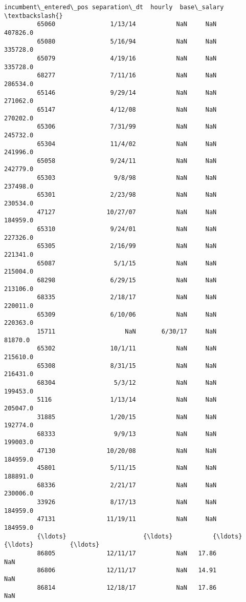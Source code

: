 \documentclass[11pt]{article}
\begin{document}
\begin{Verbatim}[commandchars=\\\{\}]
               incumbent\_entered\_pos separation\_dt  hourly  base\_salary  \textbackslash{}
         65060               1/13/14           NaN     NaN     407826.0   
         65080               5/16/94           NaN     NaN     335728.0   
         65079               4/19/16           NaN     NaN     335728.0   
         68277               7/11/16           NaN     NaN     286534.0   
         65146               9/29/14           NaN     NaN     271062.0   
         65147               4/12/08           NaN     NaN     270202.0   
         65306               7/31/99           NaN     NaN     245732.0   
         65304               11/4/02           NaN     NaN     241996.0   
         65058               9/24/11           NaN     NaN     242779.0   
         65303                9/8/98           NaN     NaN     237498.0   
         65301               2/23/98           NaN     NaN     230534.0   
         47127              10/27/07           NaN     NaN     184959.0   
         65310               9/24/01           NaN     NaN     227326.0   
         65305               2/16/99           NaN     NaN     221341.0   
         65087                5/1/15           NaN     NaN     215004.0   
         68298               6/29/15           NaN     NaN     213106.0   
         68335               2/18/17           NaN     NaN     220011.0   
         65309               6/10/06           NaN     NaN     220363.0   
         15711                   NaN       6/30/17     NaN      81870.0   
         65302               10/1/11           NaN     NaN     215610.0   
         65308               8/31/15           NaN     NaN     216431.0   
         68304                5/3/12           NaN     NaN     199453.0   
         5116                1/13/14           NaN     NaN     205047.0   
         31885               1/20/15           NaN     NaN     192774.0   
         68333                9/9/13           NaN     NaN     199003.0   
         47130              10/20/08           NaN     NaN     184959.0   
         45801               5/11/15           NaN     NaN     188891.0   
         68336               2/21/17           NaN     NaN     230006.0   
         33926               8/17/13           NaN     NaN     184959.0   
         47131              11/19/11           NaN     NaN     184959.0   
         {\ldots}                     {\ldots}           {\ldots}     {\ldots}          {\ldots}   
         86805              12/11/17           NaN   17.86          NaN   
         86806              12/11/17           NaN   14.91          NaN   
         86814              12/18/17           NaN   17.86          NaN   

\end{Verbatim}
\end{document}

